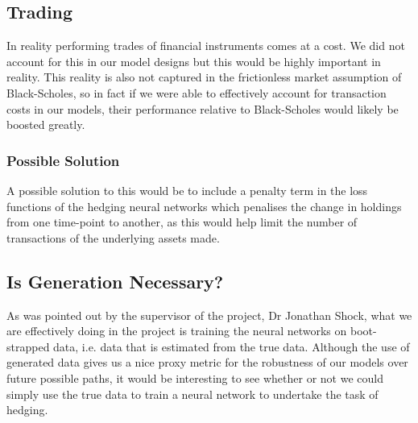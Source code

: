 \documentclass{article}
\theoremstyle{definition}
\begin{document}
\subsection{Trading}
In reality performing trades of financial instruments comes at a cost. We did not account for this in our model designs but this would be highly important in reality. This reality is also not captured in the frictionless market assumption of Black-Scholes, so in fact if we were able to effectively account for transaction costs in our models, their performance relative to Black-Scholes would likely be boosted greatly.
\subsubsection{Possible Solution}
A possible solution to this would be to include a penalty term in the loss functions of the hedging neural networks which penalises the change in holdings from one time-point to another, as this would help limit the number of transactions of the underlying assets made.

\subsection{Is Generation Necessary?}
As was pointed out by the supervisor of the project, Dr Jonathan Shock, what we are effectively doing in the project is training the neural networks on boot-strapped data, i.e. data that is estimated from the true data. Although the use of generated data gives us a nice proxy metric for the robustness of our models over future possible paths, it would be interesting to see whether or not we could simply use the true data to train a neural network to undertake the task of hedging.
\newpage

\printbibliography[title={References}, heading=bibintoc] %
\end{document}
